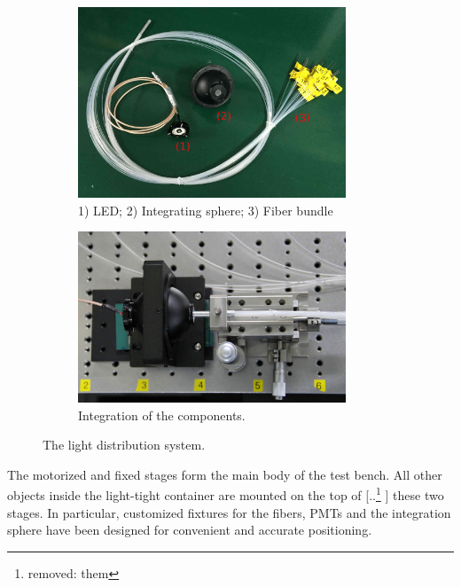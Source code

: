 \documentclass{nst}
\providecommand{\DIFadd}[1]{{\protect\color{blue} \sf #1}} %
\providecommand{\DIFdel}[1]{{\protect\color{red} [..\footnote{removed: #1} ]}} %
\providecommand{\DIFaddbegin}{} %
\providecommand{\DIFaddend}{} %
\providecommand{\DIFdelbegin}{} %
\providecommand{\DIFdelend}{} %
\begin{document}
\begin{figure}[!htb]

	\begin{subfigure}[t]{80mm}
		\includegraphics[width=80mm]{FIG3_a.jpg}
		\caption{1) LED; 2) Integrating sphere; 3) Fiber bundle}
		\label{fig:FIG3_a}
	\end{subfigure}
	\begin{subfigure}[t]{80mm}
		\includegraphics[width=80mm]{FIG3_b.jpg}
		\caption{Integration of the components.}
		\label{fig:FIG3_b}
	\end{subfigure}

	\caption{The light distribution system.}
	\label{fig:FIG3}
\end{figure}

The motorized and fixed stages form the main body of the test bench.
All other objects inside the light-tight container are mounted on the top of \DIFdelbegin \DIFdel{them}\DIFdelend \DIFaddbegin \DIFadd{these two stages}\DIFaddend .
In particular, customized fixtures for the fibers, PMTs and the integration sphere have been designed for convenient and accurate positioning.

\end{document}
